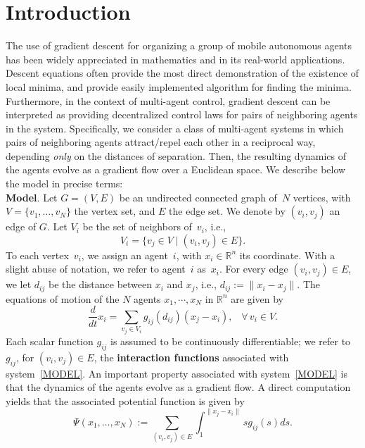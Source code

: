 \documentclass[10pt,twocolumn,twoside]{IEEEtran}
\newcommand{\R}{\mathbb{R}}
\renewcommand{\(}{\left (}
\renewcommand{\)}{\right )}
\renewcommand{\;}{\,;\,}
\begin{document}
\section{Introduction}
The use of gradient descent for organizing a group of mobile autonomous agents has been widely appreciated in mathematics and in its real-world applications. Descent equations often provide the most direct demonstration of the existence of local minima, and provide easily implemented algorithm for finding the minima. Furthermore,  in the context of multi-agent control, gradient descent can be interpreted as providing decentralized  control laws for pairs of neighboring agents in the system. Specifically, we consider a class of multi-agent systems in which pairs of neighboring agents  attract/repel each other in a reciprocal way, depending {\it only} on the distances of separation. Then, the resulting dynamics of the agents evolve as a gradient flow over a Euclidean space. We describe below the model in precise terms:   
\vspace{3pt}
\\
{\bf Model}. 
Let $G = (V,E)$ be an undirected connected graph of~$N$ vertices, with $V = \{v_1,\ldots, v_N\}$ the vertex set, and $E$ the edge set. We denote by $(v_i,v_j)$ an edge of $G$. 
Let $V_i$ be the set of neighbors of~$v_i$, i.e., $$V_i = \{v_j\in V\mid (v_i,v_j) \in E\}.$$   To each vertex~$v_i$, we assign an agent~$i$, with $ x_i \in \R^n$ its coordinate. With a slight abuse of notation, we refer to agent~$i$ as~$x_i$. For every edge $(v_i,v_j) \in E$, we let $d_{ij}$ be the distance between $x_i$ and $x_j$, i.e., $d_{ij}:= \| x_i- x_j\|$.  The equations of motion of the $N$ agents $ x_1,\cdots, x_N$ in $\mathbb{R}^n$ are given by
\begin{equation}\label{MODEL}
\frac{d}{dt}{ x}_i=\sum_{v_j\in V_i}g_{ij}(d_{ij})(x_j-x_i),\hspace{10pt} \forall\, v_i \in V.
\end{equation}
Each scalar function $g_{ij}$ is assumed to be continuously differentiable; we refer to~$g_{ij}$, for $(v_i,v_j)\in E$, the {\bf interaction functions} associated with system~\eqref{MODEL}.  
An important property associated with system~\eqref{MODEL} is that the dynamics of the agents evolve as a gradient flow. A direct computation yields that the associated potential function is given by 
\begin{equation}\label{POTENTIAL}
\Psi(x_1,\ldots,x_N):=\sum_{(v_i,v_j)\in E}\int_1^{\|x_j - x_i\|} s g_{ij}(s)ds.
\end{equation}
\end{document}

